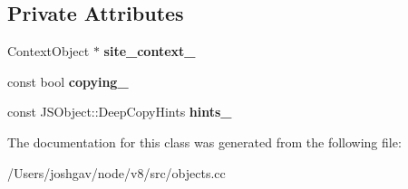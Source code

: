 \subsection*{Private Attributes}
\begin{DoxyCompactItemize}
\item 
Context\+Object $\ast$ {\bfseries site\+\_\+context\+\_\+}\hypertarget{classv8_1_1internal_1_1_j_s_object_walk_visitor_af3f451f349cf494031298405b1fceee0}{}\label{classv8_1_1internal_1_1_j_s_object_walk_visitor_af3f451f349cf494031298405b1fceee0}

\item 
const bool {\bfseries copying\+\_\+}\hypertarget{classv8_1_1internal_1_1_j_s_object_walk_visitor_a2fb7514f9cadaf27366cc381809dfcae}{}\label{classv8_1_1internal_1_1_j_s_object_walk_visitor_a2fb7514f9cadaf27366cc381809dfcae}

\item 
const J\+S\+Object\+::\+Deep\+Copy\+Hints {\bfseries hints\+\_\+}\hypertarget{classv8_1_1internal_1_1_j_s_object_walk_visitor_af1190952d1400a707e92e004e6928769}{}\label{classv8_1_1internal_1_1_j_s_object_walk_visitor_af1190952d1400a707e92e004e6928769}

\end{DoxyCompactItemize}


The documentation for this class was generated from the following file\+:\begin{DoxyCompactItemize}
\item 
/\+Users/joshgav/node/v8/src/objects.\+cc\end{DoxyCompactItemize}
